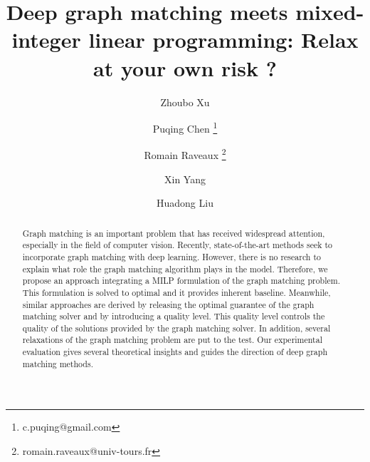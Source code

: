 \documentclass[times,onecolumn,final,authoryear]{article}
\theoremstyle{definition}
\begin{document}
\author[1]{Zhoubo Xu}

\author[1]{Puqing Chen \thanks{c.puqing@gmail.com}}

\author[2]{Romain Raveaux \thanks{romain.raveaux@univ-tours.fr}}

\author[1]{Xin Yang}
\author[1]{Huadong Liu}




\title{Deep graph matching meets mixed-integer linear programming: Relax at your own risk ?}

%
%
%
%
%



\maketitle              %

\begin{abstract}
Graph matching is an important problem that has received widespread attention, especially in the field of computer vision. Recently, state-of-the-art methods seek to incorporate graph matching with deep learning. However, there is no research to explain what role the graph matching algorithm plays in the model. Therefore, we propose an approach integrating a MILP formulation of the graph matching problem. This formulation is solved to optimal and it provides inherent baseline. Meanwhile, similar approaches are derived by releasing the optimal guarantee of the graph matching solver and by introducing a quality level. This quality level controls the quality of the solutions provided by the graph matching solver. In addition, several relaxations of the graph matching problem are put to the test. Our experimental evaluation gives several theoretical insights and guides the direction of deep graph matching methods.
\end{abstract}
\end{document}
